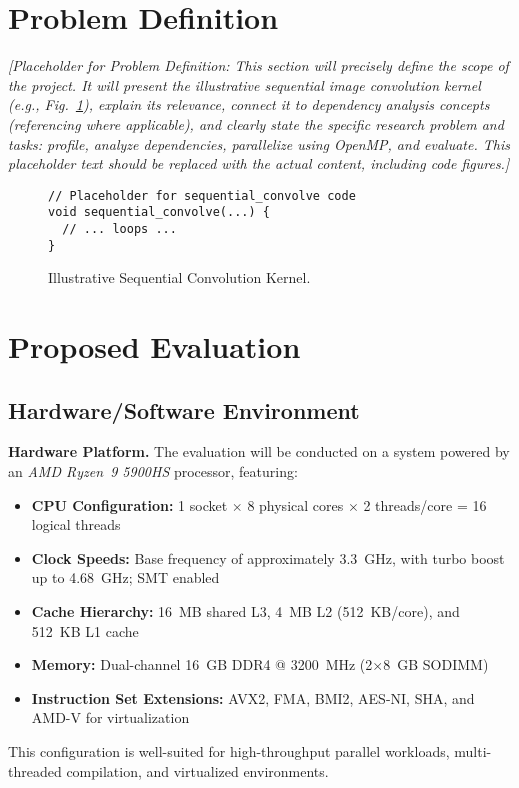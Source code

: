 \documentclass[conference, 10pt]{IEEEtran}
\begin{document}
\section{Problem Definition}
\textit{{\color{blue} %
[Placeholder for Problem Definition: This section will precisely define the scope of the project. It will present the illustrative sequential image convolution kernel (e.g., Fig.~\ref{fig:seq_code}), explain its relevance, connect it to dependency analysis concepts (referencing \cite{idkfactchecking2025} where applicable), and clearly state the specific research problem and tasks: profile, analyze dependencies, parallelize using OpenMP, and evaluate. This placeholder text should be replaced with the actual content, including code figures.]
}}

\begin{figure}[htbp]
\begin{verbatim}
// Placeholder for sequential_convolve code
void sequential_convolve(...) {
  // ... loops ...
}
\end{verbatim}
\caption{Illustrative Sequential Convolution Kernel.}
\label{fig:seq_code}
\end{figure}



\section{Proposed Evaluation}

\subsection{Hardware/Software Environment}

\textbf{Hardware Platform.} The evaluation will be conducted on a system powered by an \textit{AMD Ryzen\texttrademark~9 5900HS} processor, featuring:
\begin{itemize}
    \item \textbf{CPU Configuration:} 1 socket $\times$ 8 physical cores $\times$ 2 threads/core = 16 logical threads
    \item \textbf{Clock Speeds:} Base frequency of approximately 3.3~GHz, with turbo boost up to 4.68~GHz; SMT enabled
    \item \textbf{Cache Hierarchy:} 16~MB shared L3, 4~MB L2 (512~KB/core), and 512~KB L1 cache
    \item \textbf{Memory:} Dual-channel 16~GB DDR4 @ 3200~MHz (2$\times$8~GB SODIMM)
    \item \textbf{Instruction Set Extensions:} AVX2, FMA, BMI2, AES-NI, SHA, and AMD-V for virtualization
\end{itemize}
This configuration is well-suited for high-throughput parallel workloads, multi-threaded compilation, and virtualized environments.
\end{document}
